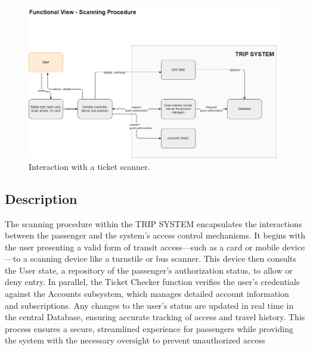 \begin{figure}[H]
    \centering
    \includegraphics[width=\textwidth]{drawings/views_final_version/functional_view scanning.png}
    \caption{Interaction with a ticket scanner.}
    \label{fig:ticket_scanner}
\end{figure}

\subsection*{Description}
The scanning procedure within the TRIP SYSTEM encapsulates the interactions between the passenger and the system's access control mechanisms. It begins with the user presenting a valid form of transit access—such as a card or mobile device—to a scanning device like a turnstile or bus scanner. This device then consults the User state, a repository of the passenger's authorization status, to allow or deny entry. In parallel, the Ticket Checker function verifies the user's credentials against the Accounts subsystem, which manages detailed account information and subscriptions. Any changes to the user's status are updated in real time in the central Database, ensuring accurate tracking of access and travel history. This process ensures a secure, streamlined experience for passengers while providing the system with the necessary oversight to prevent unauthorized access

